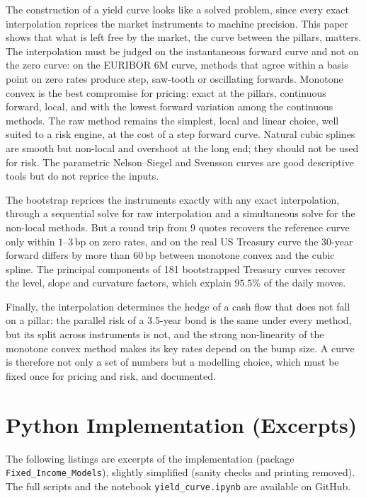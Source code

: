 \documentclass[11pt,a4paper]{article}
\theoremstyle{plain}
\theoremstyle{definition}
\newcommand{\bp}{\,\mathrm{bp}}
\begin{document}
The construction of a yield curve looks like a solved problem, since every exact interpolation reprices the market instruments to machine precision. This paper shows that what is left free by the market, the curve between the pillars, matters. The interpolation must be judged on the instantaneous forward curve and not on the zero curve: on the EURIBOR 6M curve, methods that agree within a basis point on zero rates produce step, saw-tooth or oscillating forwards. Monotone convex is the best compromise for pricing: exact at the pillars, continuous forward, local, and with the lowest forward variation among the continuous methods. The raw method remains the simplest, local and linear choice, well suited to a risk engine, at the cost of a step forward curve. Natural cubic splines are smooth but non-local and overshoot at the long end; they should not be used for risk. The parametric Nelson--Siegel and Svensson curves are good descriptive tools but do not reprice the inputs.

The bootstrap reprices the instruments exactly with any exact interpolation, through a sequential solve for raw interpolation and a simultaneous solve for the non-local methods. But a round trip from 9 quotes recovers the reference curve only within $1$--$3\bp$ on zero rates, and on the real US Treasury curve the 30-year forward differs by more than $60\bp$ between monotone convex and the cubic spline. The principal components of 181 bootstrapped Treasury curves recover the level, slope and curvature factors, which explain $95.5\%$ of the daily moves.

Finally, the interpolation determines the hedge of a cash flow that does not fall on a pillar: the parallel risk of a 3.5-year bond is the same under every method, but its split across instruments is not, and the strong non-linearity of the monotone convex method makes its key rates depend on the bump size. A curve is therefore not only a set of numbers but a modelling choice, which must be fixed once for pricing and risk, and documented.

\clearpage

\appendix
\section{Python Implementation (Excerpts)}
\label{app:code}

The following listings are excerpts of the implementation (package \texttt{Fixed\_Income\_Models}), slightly simplified (sanity checks and printing removed). The full scripts and the notebook \texttt{yield\_curve.ipynb} are available on GitHub.
\end{document}

